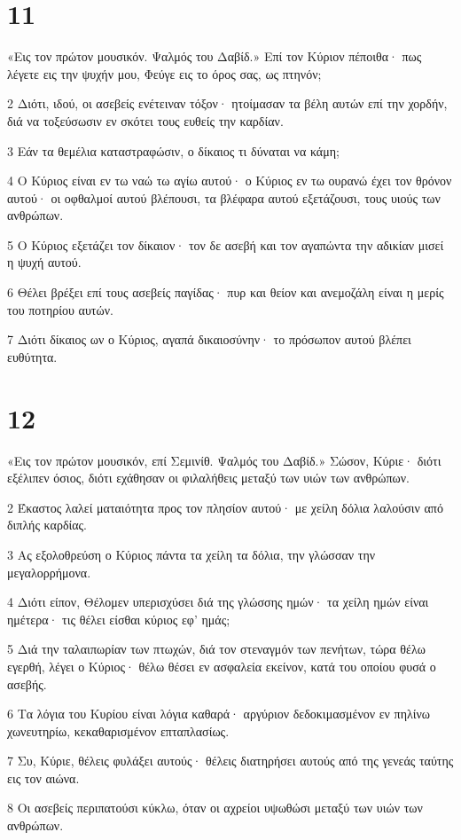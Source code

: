 \chapter{11}

\par «Εις τον πρώτον μουσικόν. Ψαλμός του Δαβίδ.» Επί τον Κύριον πέποιθα· πως λέγετε εις την ψυχήν μου, Φεύγε εις το όρος σας, ως πτηνόν;
\par 2 Διότι, ιδού, οι ασεβείς ενέτειναν τόξον· ητοίμασαν τα βέλη αυτών επί την χορδήν, διά να τοξεύσωσιν εν σκότει τους ευθείς την καρδίαν.
\par 3 Εάν τα θεμέλια καταστραφώσιν, ο δίκαιος τι δύναται να κάμη;
\par 4 Ο Κύριος είναι εν τω ναώ τω αγίω αυτού· ο Κύριος εν τω ουρανώ έχει τον θρόνον αυτού· οι οφθαλμοί αυτού βλέπουσι, τα βλέφαρα αυτού εξετάζουσι, τους υιούς των ανθρώπων.
\par 5 Ο Κύριος εξετάζει τον δίκαιον· τον δε ασεβή και τον αγαπώντα την αδικίαν μισεί η ψυχή αυτού.
\par 6 Θέλει βρέξει επί τους ασεβείς παγίδας· πυρ και θείον και ανεμοζάλη είναι η μερίς του ποτηρίου αυτών.
\par 7 Διότι δίκαιος ων ο Κύριος, αγαπά δικαιοσύνην· το πρόσωπον αυτού βλέπει ευθύτητα.

\chapter{12}

\par «Εις τον πρώτον μουσικόν, επί Σεμινίθ. Ψαλμός του Δαβίδ.» Σώσον, Κύριε· διότι εξέλιπεν όσιος, διότι εχάθησαν οι φιλαλήθεις μεταξύ των υιών των ανθρώπων.
\par 2 Έκαστος λαλεί ματαιότητα προς τον πλησίον αυτού· με χείλη δόλια λαλούσιν από διπλής καρδίας.
\par 3 Ας εξολοθρεύση ο Κύριος πάντα τα χείλη τα δόλια, την γλώσσαν την μεγαλορρήμονα.
\par 4 Διότι είπον, Θέλομεν υπερισχύσει διά της γλώσσης ημών· τα χείλη ημών είναι ημέτερα· τις θέλει είσθαι κύριος εφ' ημάς;
\par 5 Διά την ταλαιπωρίαν των πτωχών, διά τον στεναγμόν των πενήτων, τώρα θέλω εγερθή, λέγει ο Κύριος· θέλω θέσει εν ασφαλεία εκείνον, κατά του οποίου φυσά ο ασεβής.
\par 6 Τα λόγια του Κυρίου είναι λόγια καθαρά· αργύριον δεδοκιμασμένον εν πηλίνω χωνευτηρίω, κεκαθαρισμένον επταπλασίως.
\par 7 Συ, Κύριε, θέλεις φυλάξει αυτούς· θέλεις διατηρήσει αυτούς από της γενεάς ταύτης εις τον αιώνα.
\par 8 Οι ασεβείς περιπατούσι κύκλω, όταν οι αχρείοι υψωθώσι μεταξύ των υιών των ανθρώπων.

